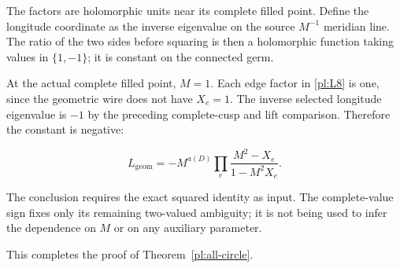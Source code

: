 The factors are holomorphic units near its complete filled point. Define
the longitude coordinate as the inverse eigenvalue on the source
\(M^{-1}\) meridian line. The ratio of the two sides before
squaring is then a holomorphic function taking values in
\(\{1,-1\}\); it is constant on the connected germ.

At the actual complete filled point, \(M=1\).
Each edge factor in \eqref{pl:L8} is one, since the geometric wire does
not have \(X_e=1\). The inverse selected longitude eigenvalue
is \(-1\) by the preceding complete-cusp and lift comparison. Therefore the constant is negative:

\begin{equation}\label{pl:L9}
\boxed{\displaystyle
 L_{\mathrm{geom}}
       =-M^{a(D)}
          \prod_e\frac{M^2-X_e}{1-M^2X_e}.}
\end{equation}

The conclusion requires the exact squared identity as input.
The complete-value sign fixes only its remaining two-valued
ambiguity; it is not being used to infer the dependence on \(M\)
or on any auxiliary parameter.

\noindent This completes the proof of Theorem~\ref{pl:all-circle}.

